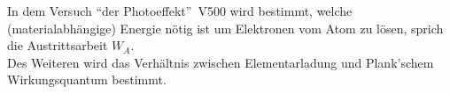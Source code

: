 In dem Versuch \textquotedblleft der Photoeffekt\textquotedblright \, V500
wird bestimmt, welche (materialabhängige) Energie nötig ist um Elektronen vom Atom zu lösen, 
sprich die Austrittsarbeit $W_A$. \\
Des Weiteren wird das Verhältnis zwischen Elementarladung und Plank'schem Wirkungsquantum bestimmt.